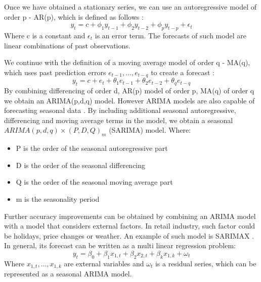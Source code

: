 \documentclass[11pt,a4paper]{article}
\begin{document}
Once we have obtained a stationary series, we can use an autoregressive model of order p - AR(p), which is defined as follows \cite{hyndman2014forecasting}:
\begin{equation}
y_t = c+ \phi_1 y_{t-1} + \phi_2 y_{t-2} + \phi_p y_{t-p} + \epsilon_t
\end{equation}
Where c is a constant and $\epsilon_t$ is an error term. The forecasts of such model are linear combinations of past observations.

We continue with the definition of a moving average model of order q - MA(q), which uses past prediction errors $e_{t-1},\dots,e_{t-q}$ to create a forecast \cite{hyndman2014forecasting}:
\begin{equation}
y_t = c + e_t + \theta_1 e_{t-1} + \theta_2 e_{t-2} + \theta_q e_{t-q}
\end{equation}
By combining differencing of order d, AR(p) model of order p, MA(q) of order q we obtain an ARIMA(p,d,q) model. However ARIMA models are also capable of forecasting seasonal data \cite{hyndman2014forecasting}. By including additional seasonal autoregressive, differencing and moving average terms in the model, we obtain a seasonal $ARIMA(p,d,q)\times(P,D,Q)_m$ (SARIMA) model.
Where:
\begin{itemize}
\item P is the order of the seasonal autoregressive part
\item D is the order of the seasonal differencing
\item Q is the order of the seasonal moving average part
\item m is the seasonality period
\end{itemize}

Further accuracy improvements can be obtained by combining an ARIMA model with a model that considers external factors. In retail industry, such factor could be holidays, price changes or weather. An example of such model is SARIMAX \cite{sarimax}. In general, its forecast can be written as a multi linear regression problem:
\begin{equation}
y_t = \beta_0 +\beta_1 x_{1,t} + \beta_2 x_{2,t} + \beta_k x_{1,k} + \omega_t
\end{equation}
Where $x_{1,t},\dots, x_{1,k}$ are external variables and $\omega_t$ is a residual series, which can be represented as a seasonal ARIMA model.
\end{document}
